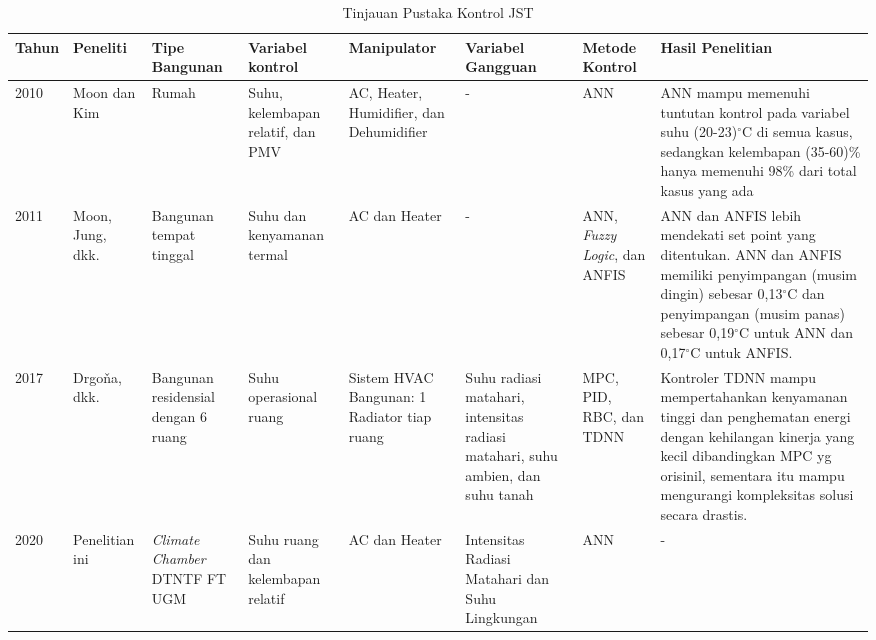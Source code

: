 \begin{landscape}
	\begin{table}[hbt!]
		\caption{Tinjauan Pustaka Kontrol JST}
		\label{tbl:2:studiANN}
		\centering
		\begin{tabular}{|p{1cm}|p{2cm}|p{1.8cm}|p{2.7cm}|p{2.5cm}|p{3.2cm}|p{1.8cm}|p{6.7cm}|}
			\hline
			
			Tahun & Peneliti & Tipe Bangunan & Variabel kontrol & Manipulator & Variabel Gangguan & Metode Kontrol & Hasil Penelitian \\ \hline
			
			2010 \cite{paper22JJkim} & Moon dan Kim & Rumah & Suhu, kelembapan relatif, dan PMV & AC, Heater, Humidifier, dan Dehumidifier & - & ANN & ANN mampu memenuhi tuntutan kontrol pada variabel suhu (20-23)$^{\circ}$C di semua kasus, sedangkan kelembapan (35-60)\% hanya memenuhi 98\% dari total kasus yang ada \\ \hline
			
			2011 \cite{paper22SKJung} & Moon, Jung, dkk. & Bangunan tempat tinggal& Suhu dan kenyamanan termal & AC dan Heater & - & ANN, \textit{Fuzzy Logic}, dan ANFIS & ANN dan ANFIS lebih mendekati set point yang ditentukan. ANN dan ANFIS memiliki penyimpangan (musim dingin) sebesar 0,13$^{\circ}$C dan penyimpangan (musim panas) sebesar 0,19$^{\circ}$C untuk ANN dan 0,17$^{\circ}$C untuk ANFIS. \\ \hline
			
			2017 \cite{paper22JanDrgona} & Drgoňa, dkk. & Bangunan residensial dengan 6 ruang & Suhu operasional ruang & Sistem HVAC Bangunan: 1 Radiator tiap ruang & Suhu radiasi matahari, intensitas radiasi matahari, suhu ambien, dan suhu tanah & MPC, PID, RBC, dan TDNN & Kontroler TDNN mampu mempertahankan kenyamanan tinggi dan penghematan energi dengan kehilangan kinerja yang kecil dibandingkan MPC yg orisinil, sementara itu mampu mengurangi kompleksitas solusi secara drastis. \\ \hline
			
			2020 & Penelitian ini & \textit{Climate Chamber} DTNTF FT UGM & Suhu ruang dan kelembapan relatif & AC dan Heater & Intensitas Radiasi Matahari dan Suhu Lingkungan & ANN & - \\ \hline
		\end{tabular}
	\end{table}
\end{landscape}